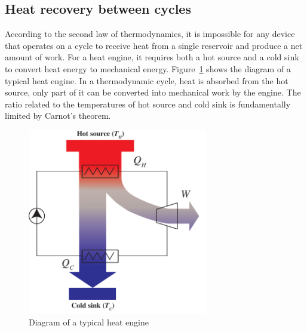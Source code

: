 %
\subsection{Heat recovery between cycles}

According to the second law of thermodynamics, it is impossible for any device that operates on a cycle to receive heat from a single reservoir and produce a net amount of work. For a heat engine, it requires both a hot source and a cold sink to convert heat energy to mechanical energy. 
Figure~\ref{fig:engines} shows the diagram of a typical heat engine. In a thermodynamic cycle, heat is absorbed from the hot source, only part of it can be converted into mechanical work by the engine. The ratio related to the temperatures of hot source and cold sink is fundamentally limited by Carnot's theorem.

\begin{figure}[h]
\centering 
\includegraphics[width=0.7\textwidth]{fig/engines}
\caption{Diagram of a typical heat engine}\label{fig:engines}
\end{figure}

